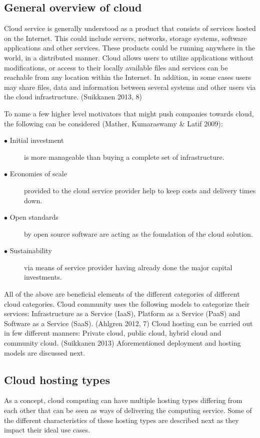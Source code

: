 \documentclass{article}
\begin{document}
\subsection{General overview of cloud}
Cloud service is generally understood as a product that consists of services hosted on the Internet. This could include servers, networks, storage systems, software applications and other services. These products could be running anywhere in the world, in a distributed manner. Cloud allows users to utilize applications without modifications, or access to their locally available files and services can be reachable from any location within the Internet. In addition, in some cases users may share files, data and information between several systems and other users via the cloud infrastructure.
(Suikkanen 2013, 8)
\par
To name a few higher level motivators that might push companies towards cloud, the following can be considered (Mather, Kumaraswamy \& Latif 2009):
\begin{description}
        \item[$\bullet$ Initial investment] is more manageable than buying a complete set of infrastructure.
        \item[$\bullet$ Economies of scale] provided to the cloud service provider help to keep costs and delivery times down.
        \item[$\bullet$ Open standards] by open source software are acting as the foundation of the cloud solution.
        \item[$\bullet$ Sustainability] via means of service provider having already done the major capital investments.
\end{description}
All of the above are beneficial elements of the different categories of different cloud categories.
Cloud community uses the following models to categorize their services: Infrastructure as a Service (IaaS), Platform as a Service (PaaS) and Software as a Service (SaaS). (Ahlgren 2012, 7)
Cloud hosting can be carried out in few different manners: Private cloud, public cloud, hybrid cloud and community cloud. (Suikkanen 2013)
Aforementioned deployment and hosting models are discussed next.
\subsection{Cloud hosting types}
As a concept, cloud computing can have multiple hosting types differing from each other that can be seen as ways of delivering the computing service. Some of the different characteristics of these hosting types are described next as they impact their ideal use cases.
\end{document}
